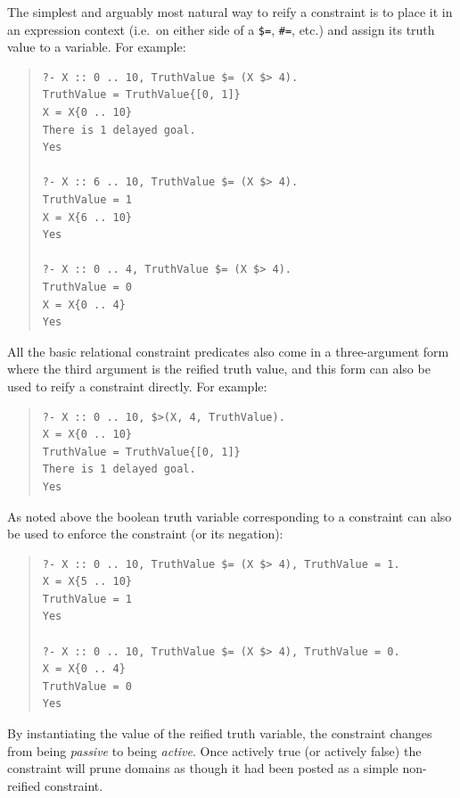 The simplest and arguably most natural way to reify a constraint is to
place it in an expression context  (i.e.\ on either side of a \verb|$=|,
\verb|#=|, etc.) and assign its truth value to a variable. For example:

\begin{quote}\begin{verbatim}
?- X :: 0 .. 10, TruthValue $= (X $> 4).
TruthValue = TruthValue{[0, 1]}
X = X{0 .. 10}
There is 1 delayed goal.
Yes

?- X :: 6 .. 10, TruthValue $= (X $> 4).
TruthValue = 1
X = X{6 .. 10}
Yes

?- X :: 0 .. 4, TruthValue $= (X $> 4).
TruthValue = 0
X = X{0 .. 4}
Yes
\end{verbatim}\end{quote}

All the basic relational constraint predicates also come in a three-argument
form where the third argument is the reified truth value, and this form can
also be used to reify a constraint directly.  For example:

\begin{quote}\begin{verbatim}
?- X :: 0 .. 10, $>(X, 4, TruthValue).
X = X{0 .. 10}
TruthValue = TruthValue{[0, 1]}
There is 1 delayed goal.
Yes
\end{verbatim}\end{quote}

As noted above the boolean truth variable corresponding to a constraint can
also be used to enforce the constraint (or its negation):

\begin{quote}\begin{verbatim}
?- X :: 0 .. 10, TruthValue $= (X $> 4), TruthValue = 1.
X = X{5 .. 10}
TruthValue = 1
Yes

?- X :: 0 .. 10, TruthValue $= (X $> 4), TruthValue = 0.
X = X{0 .. 4}
TruthValue = 0
Yes
\end{verbatim}\end{quote}

By instantiating the value of the reified truth variable, the constraint
changes from being {\em passive} to being {\em active}.  Once actively
true (or actively false) the constraint will prune domains as though
it had been posted as a simple non-reified constraint.


